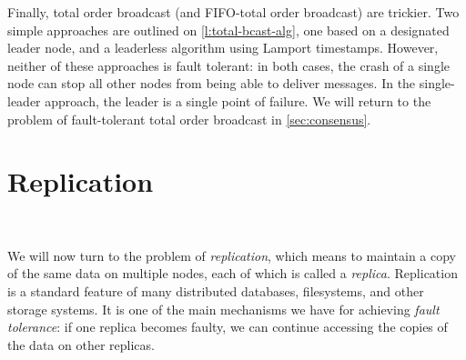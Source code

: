 Finally, total order broadcast (and FIFO-total order broadcast) are trickier.
Two simple approaches are outlined on \autoref{l:total-bcast-alg}, one based on a designated leader node, and a leaderless algorithm using Lamport timestamps.
However, neither of these approaches is fault tolerant: in both cases, the crash of a single node can stop all other nodes from being able to deliver messages.
In the single-leader approach, the leader is a single point of failure.
We will return to the problem of fault-tolerant total order broadcast in \autoref{sec:consensus}.


\section{Replication}\label{sec:replication}

\begin{frame}
    \begin{center}
        {\Large{\color{darkblue}{Replication}}} \\[2em]
        \mydetails
    \end{center}
\end{frame}

We will now turn to the problem of \emph{replication}, which means to maintain a copy of the same data on multiple nodes, each of which is called a \emph{replica}.
Replication is a standard feature of many distributed databases, filesystems, and other storage systems.
It is one of the main mechanisms we have for achieving \emph{fault tolerance}: if one replica becomes faulty, we can continue accessing the copies of the data on other replicas.

